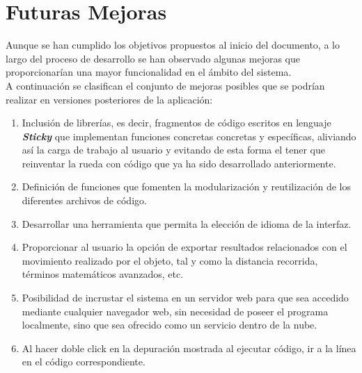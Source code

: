 \chapter{Futuras Mejoras}
Aunque se han cumplido los objetivos propuestos al inicio del documento, a lo largo del proceso de desarrollo se han observado
algunas mejoras que proporcionarían una mayor funcionalidad en el ámbito del sistema.\\

A continuación se clasifican el conjunto de mejoras posibles que se podrían realizar en versiones posteriores de la aplicación:
\begin{enumerate}
   \item Inclusión de librerías, es decir, fragmentos de código escritos en lenguaje \textbf{\textit{Sticky}} que implementan funciones concretas 
         concretas  y específicas, aliviando así la carga de trabajo al usuario y evitando de esta forma el tener que reinventar la rueda
         con código que ya ha sido desarrollado anteriormente.
   \item Definición de funciones que fomenten la modularización y reutilización de los diferentes archivos de código.
   \item Desarrollar una herramienta que permita la elección de idioma de la interfaz.
   \item Proporcionar al usuario la opción de exportar resultados relacionados con el movimiento realizado por el objeto, tal y
         como la distancia recorrida, términos matemáticos avanzados, etc.
   \item Posibilidad de incrustar el sistema en un servidor web para que sea accedido mediante cualquier navegador web, sin 
         necesidad de poseer el programa localmente, sino que sea ofrecido como un servicio dentro de la nube.
   \item Al hacer doble click en la depuración mostrada al ejecutar código, ir a la línea en el código correspondiente.
\end{enumerate}
